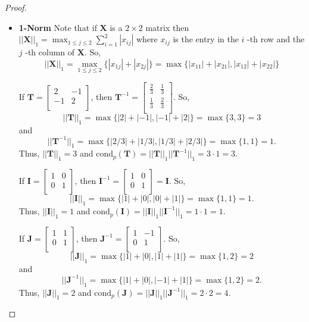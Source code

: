 \documentclass[12pt]{article}
\theoremstyle{definition}
\newcommand{\vect}[1]{\boldsymbol{#1}}
\begin{document}
\begin{proof}
  \hfill \break
  \begin{itemize}
    \item \textbf{1-Norm} Note that if $\vect{X}$ is a $2 \times 2$ matrix then
      $||\vect{X}||_1 = \max_{1\leq j \leq 2}{\sum_{i=1}^2 |x_{ij}|}$ where $x_{ij}$ is the
      entry in the $i$ -th row and the $j$ -th column of $\vect{X}$. So,
      $$||\vect{X}||_1 = \max_{1\leq j \leq 2}{\{|x_{1j}| + |x_{2j}|\}} = \max{\{ |x_{11}| + |x_{21}|, |x_{12}| + |x_{22}| \}}$$

      If $\vect{T} = \begin{bmatrix}2 & -1 \\ -1 & 2 \\\end{bmatrix}$, then
      $\vect{T}^{-1} = \begin{bmatrix}\frac{2}{3} & \frac{1}{3} \\ \frac{1}{3} & \frac{2}{3} \\\end{bmatrix}$.
      So, $$||\vect{T}||_1 = \max{\{ |2| + |-1|, |-1| + |2| \}} = \max{\{ 3, 3\}} = 3$$ and
      $$||\vect{T}^{-1}||_1 = \max{\{ |2/3| + |1/3|, |1/3| + |2/3| \}} = \max{\{ 1, 1\}} = 1.$$
      Thus, $||\vect{T}||_1 = 3$ and $\text{cond}_p(\vect{T}) = ||\vect{T}||_1 ||\vect{T}^{-1}||_1 = 3 \cdot 1 = 3$.

      If $\vect{I} = \begin{bmatrix}1 & 0 \\ 0 & 1 \\\end{bmatrix}$, then
      $\vect{I}^{-1} = \begin{bmatrix}1 & 0 \\ 0 & 1\\\end{bmatrix} = \vect{I}$.
      So, $$||\vect{I}||_1 = \max{\{ |1| + |0|, |0| + |1| \}} = \max{\{ 1, 1\}} = 1.$$
      Thus, $||\vect{I}||_1 = 1$ and $\text{cond}_p(\vect{I}) = ||\vect{I}||_1 ||\vect{I}^{-1}||_1 = 1 \cdot 1 = 1$.

      If $\vect{J} = \begin{bmatrix}1 & 1 \\ 0 & 1 \\\end{bmatrix}$, then
      $\vect{J}^{-1} = \begin{bmatrix}1 & -1 \\ 0 & 1 \\\end{bmatrix}$.
      So, $$||\vect{J}||_1 = \max{\{ |1| + |0|, |1| + |1| \}} = \max{\{ 1, 2\}} = 2$$ and
      $$||\vect{J}^{-1}||_1 = \max{\{ |1| + |0|, |-1| + |1| \}} = \max{\{ 1, 2\}} = 2.$$
      Thus, $||\vect{J}||_1 = 2$ and $\text{cond}_p(\vect{J}) = ||\vect{J}||_1 ||\vect{J}^{-1}||_1 = 2 \cdot 2 = 4$.


\end{itemize}
\end{proof}
\end{document}
